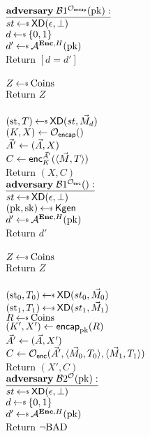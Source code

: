 \begin{figure}[tbhp]
\begin{center}
{
 {$\adversaryv{\;\advB1^{\mathcal{O}_\encap}(\pk)}$}\\
$st \getsr \mdalg(\epsilon,\bot)$\\
$d \getsr \bits$\\
$d' \getsr \advA^{\encOracle,H}(\pk)$\\
Return $[d=d']$\\ 

\\
  $Z \getsr \mathrm{Coins}$\\
  Return $Z$\\

\\
$(\st, \umd) \getsr \mdalg(st,\vmsg_d)$\\
$(K,X) \gets \mathcal{O}_\encap()$\\
$\vec{A}' \gets (\vec{A}, X)$\\
$C \gets {\mathsf{enc}}_{K}^{\vec{A}'}(\langle \vec{M}, T\rangle)$\\
Return $(X,C)$\\
}
{
{$\adversaryv{\;\advB1^{\mathcal{O}_\enc}()}$}\\
$st \getsr \mdalg(\epsilon,\bot)$\\
$(\pk,\sk)\getsr\Kgen$\\
$d' \getsr \advA^{\encOracle,H}(\pk)$\\
Return $d'$\\ 

\\
  $Z \getsr \mathrm{Coins}$\\
  Return $Z$\\

\\
$(\st_0, \umd_0) \getsr \mdalg(st_0,\vmsg_0)$\\
$(\st_1, \umd_1) \getsr \mdalg(st_1,\vmsg_1)$\\
$R \getsr \mathrm{Coins}$\\
$(K',X') \gets \mathsf{encap}_{\mathrm{pk}}^{}(R)$\\
$\vec{A}' \gets (\vec{A}, X')$\\
$C \gets \mathcal{O}_{\mathsf{enc}}(\vec{A}',\langle \vec{M}_0,T_0\rangle, \langle \vec{M}_1,T_1\rangle)$\\
Return $(X',C)$\\
}
{
{$\adversaryv{\;\advB2^{\mathcal{O}}(\pk)}$}\\
$st \getsr \mdalg(\epsilon,\bot)$\\
$d \getsr \bits$\\ 
$d' \getsr \advA^{\encOracle,H}(\pk)$\\
Return $\neg\mathrm{BAD}$\\ 

}
\end{center}
\end{figure}
